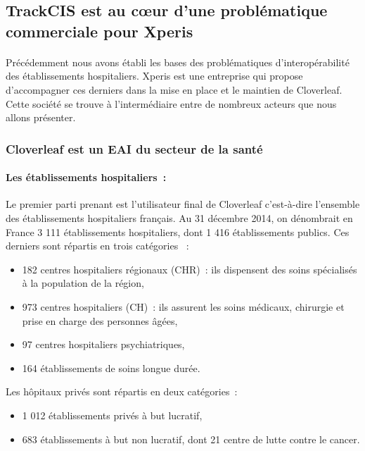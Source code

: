 	\subsection{TrackCIS est au cœur d'une problématique commerciale pour Xperis}
		\paragraph{}
		Précédemment nous avons établi les bases des problématiques d'interopérabilité
		des établissements hospitaliers. Xperis est une entreprise qui propose
		d'accompagner ces derniers dans la mise en place et le maintien de Cloverleaf.
		Cette société se trouve à l'intermédiaire entre de nombreux acteurs que nous
		allons présenter.
		
		\subsubsection{Cloverleaf est un EAI du secteur de la santé}
			\paragraph{Les établissements hospitaliers~:}%
			Le premier parti prenant est l'utilisateur final de
			Cloverleaf c'est-à-dire l'ensemble des établissements hospitaliers
			français.
			Au 31 décembre 2014, on dénombrait en France 3 111 établissements hospitaliers,
			dont 1 416 établissements publics. Ces derniers sont répartis en trois
			catégories \citep{drees_panoramas_2016}~:
			\begin{itemize}
				\item 182 centres hospitaliers régionaux (CHR)~: ils dispensent des soins 
				spécialisés à la population de la région,
				\item 973 centres hospitaliers (CH)~: ils assurent les soins médicaux, 
				chirurgie et prise en charge des personnes âgées,
				\item 97 centres hospitaliers psychiatriques,
				\item 164 établissements de soins longue durée.
			\end{itemize}
			Les hôpitaux privés sont répartis en deux catégories~:
			\begin{itemize}
				\item 1 012 établissements privés à but lucratif,
				\item 683 établissements à but non lucratif, dont 21 centre de lutte contre 
				le cancer.
			\end{itemize}
			
